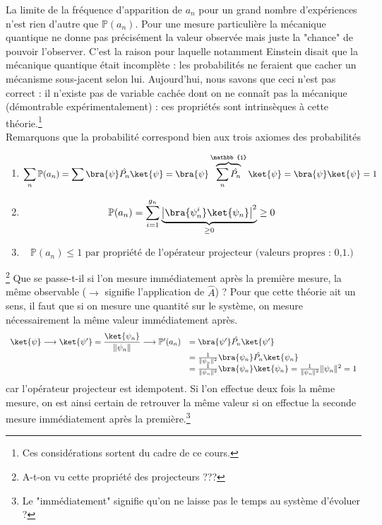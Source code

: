  La limite de la fréquence d'apparition de $a_n$ pour un grand nombre d'expériences
 n'est rien d'autre que $\mathbb{P}(a_n)$. Pour une mesure particulière la mécanique quantique ne 
 donne pas précisément  la valeur observée mais juste la "chance" de pouvoir 
 l'observer. C'est la raison pour laquelle notamment Einstein disait que la 
 mécanique quantique était incomplète : les probabilités ne feraient que 
 cacher un mécanisme sous-jacent selon lui. Aujourd'hui, nous savons que ceci n'est pas 
 correct : il n'existe pas de variable cachée dont on ne connaît pas la 
 mécanique (démontrable expérimentalement) : ces propriétés sont intrinsèques 
 à cette théorie.\footnote{Ces considérations sortent du cadre de ce cours.}\\
 
 Remarquons que la probabilité correspond bien aux trois axiomes des probabilités
 \begin{enumerate}
  \item \begin{equation}
 \sum_n \mathbb{P}(a_n) = \sum\bra{\psi}\hat{P_n}\ket{\psi} = \bra{\psi}\overbrace{
 \sum_n \hat{P_n}}^{\mathbb{1}}\ket{\psi} = \bra{\psi}\ket{\psi} = 1
 \end{equation}
 \item\begin{equation}
 \mathbb{P}(a_n) = \sum_{i=1}^{g_n} \underbrace{\left|\bra{\psi_n^i}\ket{\psi_n}
 \right|^2}_{\geq 0} \geq 0
 \end{equation}
 \item  
 \begin{equation}
 \mathbb{P}(a_n) \leq 1 \text{ par propriété de l'opérateur projecteur (valeurs propres : 0,1.)}
 \end{equation}
 \end{enumerate}
 \footnote{A-t-on vu cette propriété des projecteurs ???}
 Que se passe-t-il si l'on mesure immédiatement après la première mesure, la 
 même observable ($\longrightarrow$ signifie l'application de $\hat{A}$) ?
 Pour que cette théorie ait un sens, il faut que si on mesure une quantité sur le
 système, on mesure nécessairement la même valeur immédiatement après.
 \begin{equation}
 \begin{array}{ll}
 \ket{\psi} \longrightarrow \ket{\psi'} = \dfrac{\ket{\psi_n}}{\|\psi_n\|} \longrightarrow
 \mathbb{P}'(a_n) &= \bra{\psi'}\hat{P_n}\ket{\psi'}\\
 &= \frac{1}{\|\psi_n\|^2}\bra{\psi_n}\hat{P_n}\ket{\psi_n}\\
 &= \frac{1}{\|\psi_n\|^2}\bra{\psi_n}\ket{\psi_n} = \frac{1}{\|\psi_n\|^2}\|\psi_n\|^2=1
\end{array}
 \end{equation}
 car l'opérateur projecteur est idempotent. Si l'on effectue deux fois la même mesure, on 
 est ainsi certain de retrouver la même valeur si on effectue la seconde mesure immédiatement 
 après la première.\footnote{Le "immédiatement" signifie qu'on ne laisse pas le temps au système
 d'évoluer ?}
 
